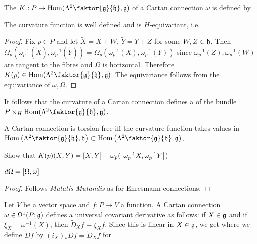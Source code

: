 \documentclass{article}
\begin{document}
\begin{definition}
The  $K : P \to \Hom(\Lambda^2 \faktor{\mf{g}}{\mf{h}},\mf{g})$ of a Cartan connection $\omega$ is defined by 
\end{definition}

\begin{lemma}
The curvature function is well defined and is $H$-equivariant, i.e. 
\end{lemma}
\begin{proof}
Fix $p \in P $ and let $\tilde{X} = X + W, \, \tilde{Y} = Y+Z$ for some $W,Z \in \mf{h}$. Then $\Omega_p(\omega_p^{-1}(\tilde{X}),\omega_p^{-1}(\tilde{Y})) = \Omega_p(\omega_p^{-1}(X),\omega_p^{-1}(Y))$ since $\omega_p^{-1}(Z),\omega_p^{-1}(W)$ are tangent to the fibres and $\Omega$ is horizontal. Therefore $K(p) \in \Hom(\Lambda^2 \faktor{\mf{g}}{\mf{h}},\mf{g})$. The equivariance follows from the equivariance of $\omega, \Omega$. 
\end{proof}

It follows that the curvature of a Cartan connection defines a  of the bundle\\
${P \times_H \Hom(\Lambda^2 \faktor{\mf{g}}{\mf{h}},\mf{g})}$. 

\begin{prop}
A Cartan connection is torsion free iff the curvature function takes values in \\ $\Hom\pround{\Lambda^2 \faktor{\mf{g}}{\mf{h}},\mf{h}} \subset \Hom\pround{\Lambda^2 \faktor{\mf{g}}{\mf{h}},\mf{g}}$. 
\end{prop}

\begin{ex}
Show that $K(p)(X,Y) = \comm[X]{Y} - \omega_p(\comm[\omega_p^{-1}X]{\omega_p^{-1}Y})$
\end{ex}

\begin{lemma}
$d\Omega = \comm[\Omega]{\omega}$
\end{lemma}
\begin{proof}
Follows \textit{Mutatis Mutandis} as for Ehresmann connections. 
\end{proof}

Let $V$ be a vector space and $f: P \to V$ a function. A Cartan connection $\omega \in \Omega^1(P;\mf{g})$ defines a universal covariant derivative as follows: if $X \in \mf{g}$ and if $\xi_X = \omega^{-1}(X)$, then $\tilde{D}_X f \equiv \xi_X f$. Since this is linear in $X \in \mf{g}$, we get 
where we define $\tilde{D}f$ by $(i_X)_\ast \tilde{D}f = \tilde{D}_X f$ for 
\end{document}
